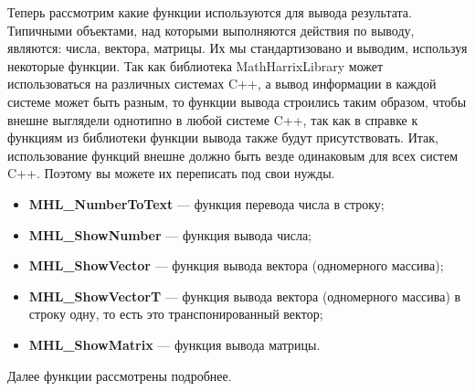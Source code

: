 \documentclass[a4paper,12pt]{article}
\begin{document}
Теперь рассмотрим какие функции используются для вывода результата. Типичными объектами, над которыми выполняются действия по выводу, являются: числа, вектора, матрицы. Их мы стандартизовано и выводим, используя некоторые функции. Так как библиотека MathHarrixLibrary может использоваться на различных системах C++, а вывод информации в каждой системе может быть разным, то функции вывода строились таким образом, чтобы внешне выглядели однотипно в любой системе C++, так как в справке к функциям из библиотеки функции вывода также будут присутствовать. Итак, использование функций внешне должно быть везде одинаковым для всех систем C++.  Поэтому вы можете их переписать под свои нужды.


\begin{itemize}
\item \textbf{MHL\_NumberToText} --- функция перевода числа в строку; 
\item \textbf{MHL\_ShowNumber} --- функция вывода числа;
\item \textbf{MHL\_ShowVector} --- функция вывода вектора (одномерного массива);
\item \textbf{MHL\_ShowVectorT} --- функция вывода вектора (одномерного массива) в строку одну, то есть это транспонированный вектор;
\item \textbf{MHL\_ShowMatrix} --- функция вывода матрицы.
\end{itemize}

Далее функции рассмотрены подробнее.
\end{document}
